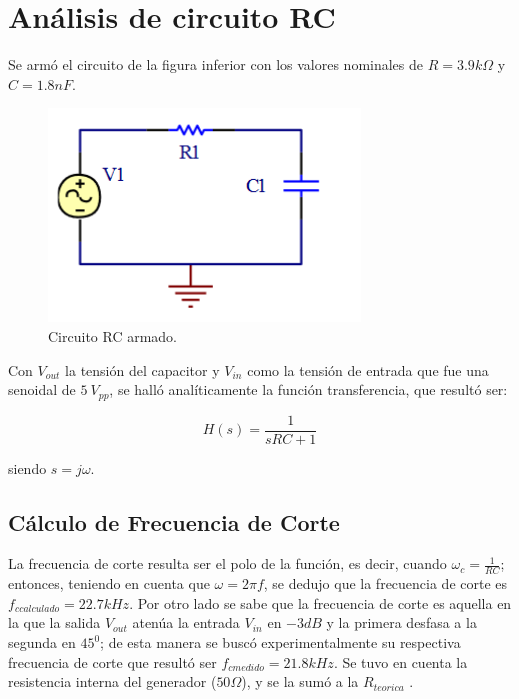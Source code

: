 


\onehalfspacing



\section{Análisis de circuito RC}

Se armó el circuito de la figura inferior con los valores nominales de $R=3.9k\Omega$ y $C=1.8nF$.
\begin{figure}[h!]
\centering
\includegraphics[scale=0.5]{rcCircuito.png}
\caption{Circuito RC armado.}
\label{fig:RC}
\end{figure}

\vspace{5mm}
Con $V_{out}$ la tensión del capacitor y $V_{in}$ como la tensión de entrada que fue una senoidal de $5~V_{pp}$, se halló analíticamente la función transferencia, que resultó ser:

\begin{center}
\begin{equation}
H(s)=\frac{1}{sRC+1}
\end{equation}
\end{center}

siendo $s=j\omega.$


\subsection{Cálculo de Frecuencia de Corte}

La frecuencia de corte resulta ser el polo de la función, es decir, cuando $\omega_c=\frac{1}{RC}$;
entonces, teniendo en cuenta que $\omega=2\pi f$, se dedujo que la frecuencia de corte es $f_{ccalculado}=22.7kHz$. 
Por otro lado se sabe que la frecuencia de corte es aquella en la que la salida
$V_{out}$ atenúa la entrada $V_{in}$ en $-3dB$ y la primera desfasa a la segunda en $45^0$; de esta manera
se buscó experimentalmente su respectiva frecuencia de corte que resultó ser $f_{cmedido}=21.8kHz$. Se tuvo en cuenta la resistencia interna
del generador ($50\Omega$), y se la sumó a la $R_{teorica}$ .

